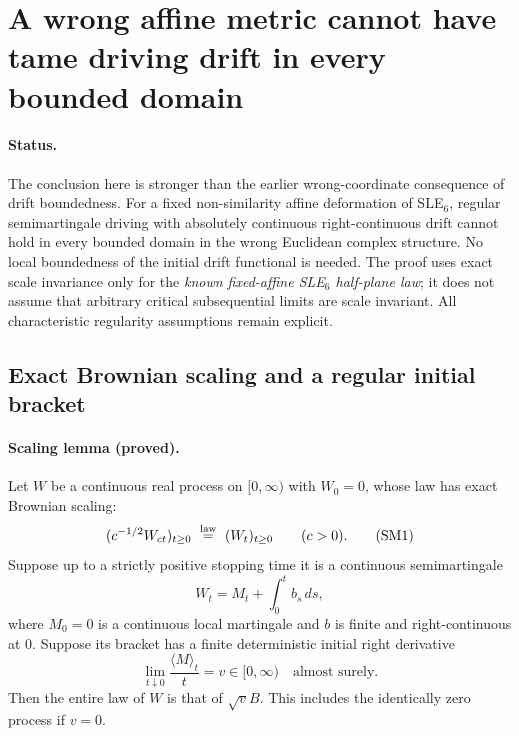 \documentclass[11pt]{article}
\theoremstyle{definition}\newtheorem{definition}[theorem]{Definition}
\theoremstyle{remark}\newtheorem{remark}[theorem]{Remark}
\begin{document}
\section{A wrong affine metric cannot have tame driving drift in every bounded domain}
\label{sec:scaling-semimartingale}

\paragraph{Status.}
The conclusion here is stronger than the earlier wrong-coordinate consequence
of drift boundedness.  For a fixed non-similarity affine deformation of SLE$_6$,
regular semimartingale driving with absolutely continuous right-continuous
drift cannot hold in every bounded domain in the wrong Euclidean complex
structure.  No local boundedness of the initial drift functional is needed.
The proof uses exact scale invariance only for the \emph{known fixed-affine
SLE$_6$ half-plane law}; it does not assume that arbitrary critical
subsequential limits are scale invariant.  All characteristic regularity
assumptions remain explicit.

\subsection{Exact Brownian scaling and a regular initial bracket}

\paragraph{Scaling lemma (proved).}
Let $W$ be a continuous real process on $[0,\infty)$ with $W_0=0$, whose law
has exact Brownian scaling:
\[
 (c^{-1/2}W_{ct})_{t\geq0}\ \stackrel{\rm law}{=}\ (W_t)_{t\geq0}
 \qquad(c>0).
 \tag{SM1}
\]
Suppose up to a strictly positive stopping time it is a continuous
semimartingale
\[
 W_t=M_t+\int_0^t b_s\,ds,
 \tag{SM2}
\]
where $M_0=0$ is a continuous local martingale and $b$ is finite and
right-continuous at $0$.  Suppose its bracket has a finite deterministic
initial right derivative
\[
 \lim_{t\downarrow0}\frac{\langle M\rangle_t}{t}=v\in[0,\infty)
 \quad\text{almost surely}.
 \tag{SM3}
\]
Then the entire law of $W$ is that of $\sqrt v B$.  This includes the
identically zero process if $v=0$.
\end{document}
